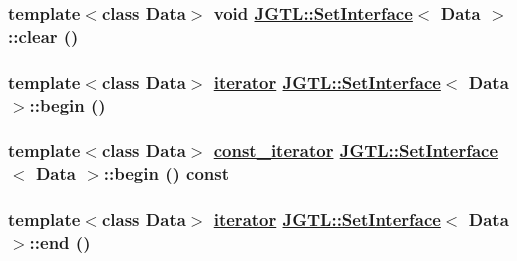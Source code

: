 \hypertarget{class_j_g_t_l_1_1_set_interface_62ad8783677fdbfdca6e133574c384de}{
\subsubsection[clear]{\setlength{\rightskip}{0pt plus 5cm}template$<$class Data$>$ void \hyperlink{class_j_g_t_l_1_1_set_interface}{JGTL::Set\-Interface}$<$ Data $>$::clear ()}}
\label{class_j_g_t_l_1_1_set_interface_62ad8783677fdbfdca6e133574c384de}


\hypertarget{class_j_g_t_l_1_1_set_interface_d00e33172d553f527abdb53795fbe9da}{
\subsubsection[begin]{\setlength{\rightskip}{0pt plus 5cm}template$<$class Data$>$ \hyperlink{class_j_g_t_l_1_1_set_interface_1f4b953e9a9adb5d463b6abb24623372}{iterator} \hyperlink{class_j_g_t_l_1_1_set_interface}{JGTL::Set\-Interface}$<$ Data $>$::begin ()}}
\label{class_j_g_t_l_1_1_set_interface_d00e33172d553f527abdb53795fbe9da}


\hypertarget{class_j_g_t_l_1_1_set_interface_cffbe1ad98d710b21c676f146359884c}{
\subsubsection[begin]{\setlength{\rightskip}{0pt plus 5cm}template$<$class Data$>$ \hyperlink{class_j_g_t_l_1_1_set_interface_1e545e77790db36de24904dc70054225}{const\_\-iterator} \hyperlink{class_j_g_t_l_1_1_set_interface}{JGTL::Set\-Interface}$<$ Data $>$::begin () const}}
\label{class_j_g_t_l_1_1_set_interface_cffbe1ad98d710b21c676f146359884c}


\hypertarget{class_j_g_t_l_1_1_set_interface_0d17cba0219448c6119c31374b983e76}{
\subsubsection[end]{\setlength{\rightskip}{0pt plus 5cm}template$<$class Data$>$ \hyperlink{class_j_g_t_l_1_1_set_interface_1f4b953e9a9adb5d463b6abb24623372}{iterator} \hyperlink{class_j_g_t_l_1_1_set_interface}{JGTL::Set\-Interface}$<$ Data $>$::end ()}}
\label{class_j_g_t_l_1_1_set_interface_0d17cba0219448c6119c31374b983e76}



